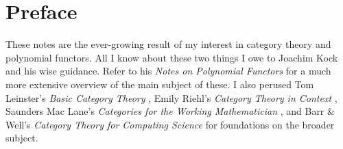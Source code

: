 \section*{Preface}

These notes are the ever-growing result of my interest in category theory and polynomial functors. All I know about these two things I owe to Joachim Kock and his wise guidance. Refer to his \emph{Notes on Polynomial Functors} \cite{kock} for a much more extensive overview of the main subject of these. I also perused Tom Leinster's \emph{Basic Category Theory} \cite{leinster}, Emily Riehl's \emph{Category Theory in Context} \cite{riehl}, Saunders Mac Lane's \emph{Categories for the Working Mathematician} \cite{maclane}, and Barr \& Well's \emph{Category Theory for Computing Science} \cite{cs} for foundations on the broader subject.
